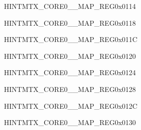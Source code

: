 \begin{register}{H}{INTMTX\_CORE0\_\_MAP\_REG}{0x0114}\label{regdesc:INTMTXCORE0DMAOUTCH0INTRMAPREG}
\end{register}\vspace{-3em}


\begin{register}{H}{INTMTX\_CORE0\_\_MAP\_REG}{0x0118}\label{regdesc:INTMTXCORE0DMAOUTCH1INTRMAPREG}
\end{register}\vspace{-3em}


\begin{register}{H}{INTMTX\_CORE0\_\_MAP\_REG}{0x011C}\label{regdesc:INTMTXCORE0DMAOUTCH2INTRMAPREG}
\end{register}\vspace{-3em}


\begin{register}{H}{INTMTX\_CORE0\_\_MAP\_REG}{0x0120}\label{regdesc:INTMTXCORE0GPSPI2INTRMAPREG}
\end{register}\vspace{-3em}


\begin{register}{H}{INTMTX\_CORE0\_\_MAP\_REG}{0x0124}\label{regdesc:INTMTXCORE0AESINTRMAPREG}
\end{register}\vspace{-3em}


\begin{register}{H}{INTMTX\_CORE0\_\_MAP\_REG}{0x0128}\label{regdesc:INTMTXCORE0SHAINTRMAPREG}
\end{register}\vspace{-3em}


\begin{register}{H}{INTMTX\_CORE0\_\_MAP\_REG}{0x012C}\label{regdesc:INTMTXCORE0RSAINTRMAPREG}
\end{register}\vspace{-3em}


\begin{register}{H}{INTMTX\_CORE0\_\_MAP\_REG}{0x0130}\label{regdesc:INTMTXCORE0ECCINTRMAPREG}
\end{register}\vspace{-3em}




